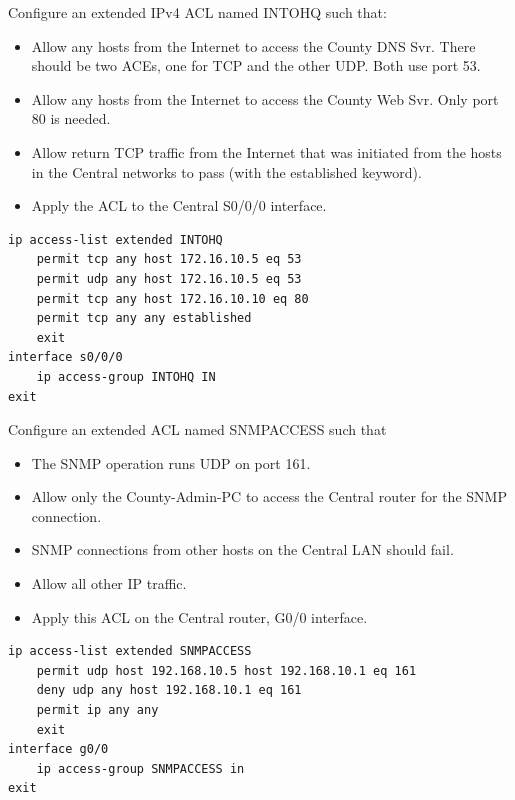 \begin{example}
Configure an extended IPv4 ACL named INTOHQ such that: 
\begin{itemize}
\item Allow any hosts from the Internet to access the County DNS Svr. There should be two ACEs, one for TCP and the other UDP. Both use port 53.
\item Allow any hosts from the Internet to access the County Web Svr. Only port 80 is needed.
\item Allow return TCP traffic from the Internet that was initiated from the hosts in the Central networks to pass (with the established keyword).
\item Apply the ACL to the Central S0/0/0 interface.
\end{itemize}
\begin{verbatim}
ip access-list extended INTOHQ
	permit tcp any host 172.16.10.5 eq 53
	permit udp any host 172.16.10.5 eq 53
	permit tcp any host 172.16.10.10 eq 80
	permit tcp any any established
	exit
interface s0/0/0
	ip access-group INTOHQ IN
exit
\end{verbatim}
\end{example}
\begin{example}
Configure an extended ACL named SNMPACCESS such that 
\begin{itemize}
\item The SNMP operation runs UDP on port 161.
\item Allow only the County-Admin-PC to access the Central router for the SNMP connection.
\item SNMP connections from other hosts on the Central LAN should fail.
\item Allow all other IP traffic.
\item Apply this ACL on the Central router, G0/0 interface.
\end{itemize}
\begin{verbatim}
ip access-list extended SNMPACCESS
	permit udp host 192.168.10.5 host 192.168.10.1 eq 161
	deny udp any host 192.168.10.1 eq 161
	permit ip any any
	exit
interface g0/0
	ip access-group SNMPACCESS in
exit

\end{verbatim}
\end{example}
